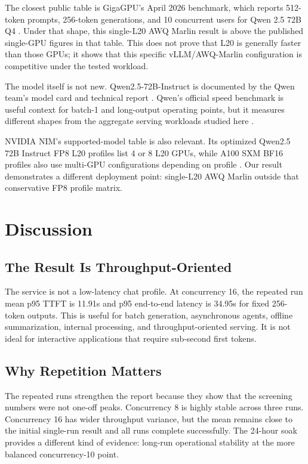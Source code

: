 \documentclass[11pt]{article}
\newcommand{\qwenbase}{Qwen2.5\nobreakdash-72B}
\begin{document}
The closest public table is GigaGPU's April 2026 benchmark, which reports
512-token prompts, 256-token generations, and 10 concurrent users for Qwen 2.5
72B Q4 \cite{gigagpu_2026}. Under that shape, this single-L20 AWQ Marlin result
is above the published single-GPU figures in that table. This does not prove
that L20 is generally faster than those GPUs; it shows that this specific
vLLM/AWQ-Marlin configuration is competitive under the tested workload.

The model itself is not new. \qwenbase{}-Instruct is documented by the Qwen
team's model card and technical report \cite{qwen25_model_card,qwen25_report}.
Qwen's official speed benchmark is useful context for batch-1 and long-output
operating points, but it measures different shapes from the aggregate serving
workloads studied here \cite{qwen25_speed_benchmark}.

NVIDIA NIM's supported-model table is also relevant. Its optimized Qwen2.5 72B
Instruct FP8 L20 profiles list 4 or 8 L20 GPUs, while A100 SXM BF16 profiles
also use multi-GPU configurations depending on profile \cite{nvidia_nim_supported}.
Our result demonstrates a different deployment point: single-L20 AWQ Marlin
outside that conservative FP8 profile matrix.

\section{Discussion}

\subsection{The Result Is Throughput-Oriented}

The service is not a low-latency chat profile. At concurrency 16, the repeated
run mean p95 TTFT is 11.91s and p95 end-to-end latency is 34.95s for fixed
256-token outputs. This is useful for batch generation, asynchronous agents,
offline summarization, internal processing, and throughput-oriented serving. It
is not ideal for interactive applications that require sub-second first tokens.

\subsection{Why Repetition Matters}

The repeated runs strengthen the report because they show that the screening
numbers were not one-off peaks. Concurrency 8 is highly stable across three
runs. Concurrency 16 has wider throughput variance, but the mean remains close
to the initial single-run result and all runs complete successfully. The 24-hour
soak provides a different kind of evidence: long-run operational stability at
the more balanced concurrency-10 point.
\end{document}
